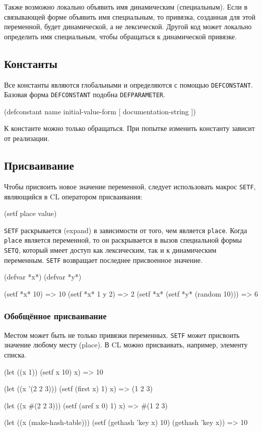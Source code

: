 Также возможно локально объявить имя динамическим (специальным). Если в связывающей форме объявить имя специальным, то привязка, созданная для этой переменной, будет динамической, а не лексической. Другой код может локально определить имя специальным, чтобы обращаться к динамической привязке.

\subsection{Константы}
Все константы являются глобальными и определяются с помощью \lstinline{DEFCONSTANT}. Базовая форма \lstinline{DEFCONSTANT} подобна \lstinline{DEFPARAMETER}.
\begin{cllst}{}{}
(defconstant name initial-value-form [ documentation-string ])
\end{cllst}

К константе можно только обращаться. При попытке изменить константу зависит от реализации.

\subsection{Присваивание}
Чтобы присвоить новое значение переменной, следует использовать макрос \lstinline{SETF}, являющийся в CL оператором присваивания:
\begin{cllst}{}{}
(setf place value)
\end{cllst}

\lstinline{SETF} раскрывается (expand) в зависимости от того, чем является \lstinline{place}. Когда \lstinline{place} является переменной, то он раскрывается в вызов специальной формы \lstinline{SETQ}, который имеет доступ как лексическим, так и к динамическим переменным. \lstinline{SETF} возвращает последнее присвоенное значение.
\begin{cllst}{}{}
(defvar *x*)
(defvar *y*)

(setf *x* 10) => 10
(setf *x* 1 y 2) => 2
(setf *x* (setf *y* (random 10))) => 6
\end{cllst}

\subsubsection{Обобщённое присваивание}
Местом может быть не только привязки переменных. \lstinline{SETF} может присвоить значение любому месту (place). В CL можно присваивать, например, элементу списка.
\begin{cllst}{}{}
(let ((x 1))
  (setf x 10)
  x) => 10

(let ((x '(2 2 3)))
  (setf (first x) 1)
  x) => (1 2 3)

(let ((x #(2 2 3)))
  (setf (aref x 0) 1)
  x) => #(1 2 3)

(let ((x (make-hash-table)))
  (setf (gethash 'key x) 10)
  (gethash 'key x)) => 10
\end{cllst}

